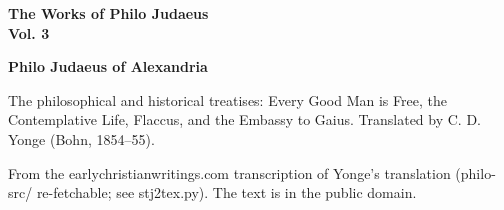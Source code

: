 \documentclass[11pt,letterpaper]{article}
\begin{document}
\color{ink}

\begin{titlepage}
\centering
\vspace*{4em}
{\LARGE\bfseries\color{heading} The Works of Philo Judaeus\\[0.3em]Vol. 3\par}
\vspace{2em}
{\Large\bfseries\color{heading} Philo Judaeus of Alexandria\par}
\vspace{2.5em}
{\itshape\color{subhead}\parbox{0.8\linewidth}{\centering The philosophical and historical treatises: Every Good Man is Free, the Contemplative Life, Flaccus, and the Embassy to Gaius. Translated by C. D. Yonge (Bohn, 1854--55).\par}}
\vfill
{\small From the earlychristianwritings.com transcription of Yonge's translation (philo-src/ re-fetchable; see stj2tex.py). The text is in the public domain.\par}
\vspace{2em}
\end{titlepage}

\tableofcontents


\end{document}
